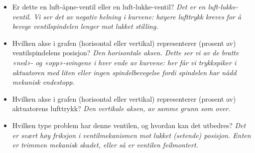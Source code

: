 \begin{itemize}
\item{} Er dette en luft-åpne-ventil eller en luft-lukke-ventil? {\it Det er en luft-lukke-ventil. Vi ser det av negativ helning i kurvene: høyere lufttrykk kreves for å bevege ventilspindelen lenger mot lukket stilling.}
\vskip 10pt
\item{} Hvilken akse i grafen (horisontal eller vertikal) representerer (prosent av) ventilspindelens posisjon? {\it Den horisontale aksen. Dette ser vi av de bratte «ned»- og «opp»-svingene i hver ende av kurvene: her får vi trykkspiker i aktuatoren med liten eller ingen spindelbevegelse fordi spindelen har nådd mekanisk endestopp.}
\vskip 10pt
\item{} Hvilken akse i grafen (horisontal eller vertikal) representerer (prosent av) aktuatorens lufttrykk? {\it Den vertikale aksen, av samme grunn som over.}
\vskip 10pt
\item{} Hvilken type problem har denne ventilen, og hvordan kan det utbedres? {\it Det er svært høy friksjon i ventilmekanismen mot lukket (setende) posisjon. Enten er trimmen mekanisk skadet, eller så er ventilen feilmontert.}
\end{itemize}


